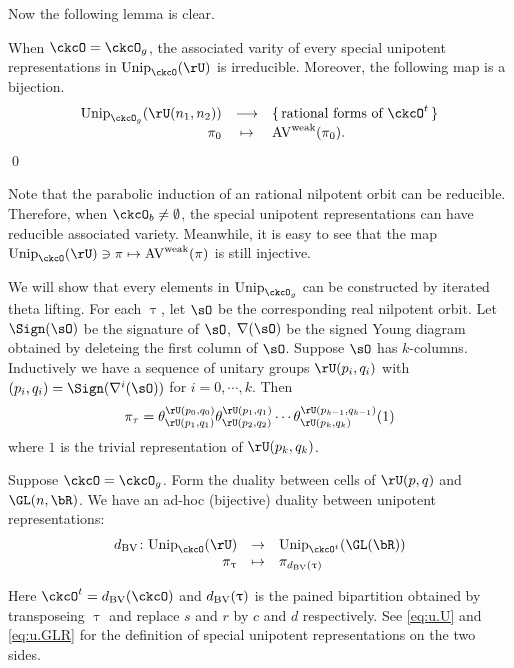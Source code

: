 \documentclass[counting_main.tex]{subfiles}
\begin{document}
Now the following lemma is clear.
\begin{lem}
When $\ckcO=\ckcO_g$, the associated varity of every special unipotent representations in $\Unip_\ckcO(\rU)$
is irreducible. Moreover, the following map  is a bijection.
\[
  \begin{array}{rcl}
  \Unip_{\ckcO_g}(\rU(n_1,n_2)) &\longrightarrow& \set{\text{rational forms of $\ckcO^t$}}\\
  \pi_0 & \mapsto & \wAV(\pi_0).
  \end{array}
\]
\qed
\end{lem}
\begin{remark}
  Note that the parabolic induction of an rational nilpotent orbit can be reducible.
  Therefore, when $\ckcO_b\neq \emptyset$, the special unipotent representations can have
  reducible associated variety. Meanwhile, it is easy to see that the map
  $\Unip_{\ckcO}(\rU) \ni \pi \mapsto\wAV(\pi)$ is still injective.
\end{remark}

We will show that every elements in $\Unip_{\ckcO_g}$ can be constructed by iterated theta lifting.
For each $\uptau$, let $\sO$ be the corresponding real nilpotent orbit. Let
$\Sign(\sO)$ be the signature of $\sO$, $\DD(\sO)$ be the signed Young diagram
obtained by deleteing the first column of $\sO$.
Suppose $\sO$ has $k$-columns. Inductively we have a sequence of unitary groups
$\rU(p_i,q_i)$ with $(p_i,q_i) = \Sign(\DD^i(\sO))$ for $i=0, \cdots, k$. Then
\begin{equation}\label{eq:u.U}
  \pi_\tau = \theta^{\rU(p_0,q_0)}_{\rU(p_1,q_1)} \theta^{\rU(p_1,q_1)}_{\rU(p_2,q_2)}\cdots
\theta^{\rU(p_{k-1},q_{k-1})}_{\rU(p_k,q_k)}(1)
\end{equation}
where $1$ is the trivial representation of $\rU(p_k,q_k)$.


Suppose $\ckcO = \ckcO_g$. Form the duality between cells of $\rU(p,q)$ and
$\GL(n,\bR)$. We have an ad-hoc (bijective) duality between unipotent
representations:
\[
  \begin{array}{rcl}
 \dBV\colon \Unip_{\ckcO}(\rU)& \rightarrow &\Unip_{\ckcO^t}(\GL(\bR)) \\
 \pi_\uptau &\mapsto& \pi_{\dBV(\uptau)} \\
  \end{array}
\]

Here $\ckcO^t = \dBV(\ckcO)$ and $d_{\mathrm{BV}}(\uptau)$ is the pained bipartition
obtained by transposeing $\uptau$ and replace $s$ and $r$ by $c$ and $d$
respectively. See \eqref{eq:u.U} and \eqref{eq:u.GLR} for the definition of
special unipotent representations on the two sides.
\end{document}
